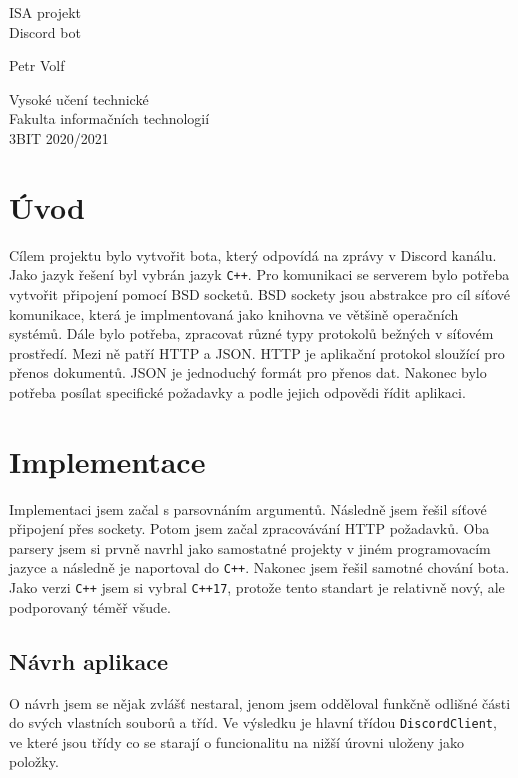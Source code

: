 \documentclass[a4paper,10pt]{article}
\begin{document}
\begin{titlepage}
   \begin{center}
 \vfill
 ISA projekt\\
 \vspace{20pt}
 \Huge
 Discord bot
\Large

  \vspace{20pt}
 Petr Volf

  \vfill
   \normalsize
   Vysoké učení technické\\
   Fakulta informačních technologií\\
3BIT 2020/2021
    \end{center}
\end{titlepage}

\tableofcontents

\section{Úvod}
Cílem projektu bylo vytvořit bota, který odpovídá na zprávy v Discord kanálu. Jako jazyk řešení byl vybrán jazyk \verb|C++|. Pro komunikaci se serverem bylo potřeba vytvořit připojení pomocí BSD socketů. BSD sockety jsou abstrakce pro cíl síťové komunikace, která je implmentovaná jako knihovna ve většině operačních systémů. Dále bylo potřeba, zpracovat různé typy protokolů bežných v síťovém prostředí. Mezi ně patří HTTP a JSON. HTTP je aplikační protokol sloužící pro přenos dokumentů. JSON je jednoduchý formát pro přenos dat. Nakonec bylo potřeba posílat specifické požadavky a podle jejich odpovědi řídit aplikaci. 

\section{Implementace}
Implementaci jsem začal s parsovnáním argumentů. Následně jsem řešil síťové připojení přes sockety. Potom jsem začal zpracovávání HTTP požadavků. Oba parsery jsem si prvně navrhl jako samostatné projekty v jiném programovacím jazyce a následně je naportoval do \verb|C++|. Nakonec jsem řešil samotné chování bota. Jako verzi \verb|C++| jsem si vybral \verb|C++17|, protože tento standart je relativně nový, ale podporovaný téměř všude.

\subsection{Návrh aplikace}
O návrh jsem se nějak zvlášť nestaral, jenom jsem odděloval funkčně odlišné části do svých vlastních souborů a tříd. Ve výsledku je hlavní třídou \verb|DiscordClient|, ve které jsou třídy co se starají o funcionalitu na nižší úrovni uloženy jako položky.
\end{document}
